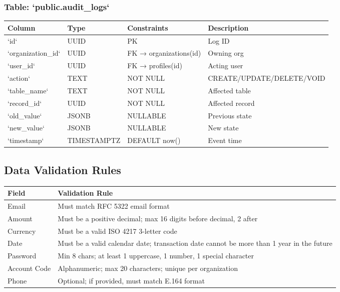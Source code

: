 \documentclass[journal, a4paper, onecolumn, 12pt]{IEEEtran}
\begin{document}
\subsubsection{Table: `public.audit\_logs`}
\begin{longtable}{|p{}|p{}|p{}|p{}|}
\hline
Column & Type & Constraints & Description \\ \hline
\hline
`id` & UUID & PK & Log ID \\ \hline
`organization\_id` & UUID & FK → organizations(id) & Owning org \\ \hline
`user\_id` & UUID & FK → profiles(id) & Acting user \\ \hline
`action` & TEXT & NOT NULL & CREATE/UPDATE/DELETE/VOID \\ \hline
`table\_name` & TEXT & NOT NULL & Affected table \\ \hline
`record\_id` & UUID & NOT NULL & Affected record \\ \hline
`old\_value` & JSONB & NULLABLE & Previous state \\ \hline
`new\_value` & JSONB & NULLABLE & New state \\ \hline
`timestamp` & TIMESTAMPTZ & DEFAULT now() & Event time \\ \hline
\end{longtable}
\subsection{Data Validation Rules}

\begin{longtable}{|p{}|p{}|}
\hline
Field & Validation Rule \\ \hline
\hline
Email & Must match RFC 5322 email format \\ \hline
Amount & Must be a positive decimal; max 16 digits before decimal, 2 after \\ \hline
Currency & Must be a valid ISO 4217 3-letter code \\ \hline
Date & Must be a valid calendar date; transaction date cannot be more than 1 year in the future \\ \hline
Password & Min 8 chars; at least 1 uppercase, 1 number, 1 special character \\ \hline
Account Code & Alphanumeric; max 20 characters; unique per organization \\ \hline
Phone & Optional; if provided, must match E.164 format \\ \hline
\end{longtable}
\end{document}
